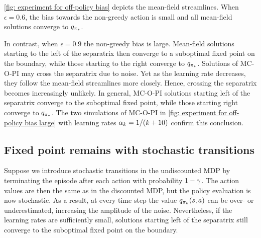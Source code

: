 \autoref{fig: experiment for off-policy bias} depicts the mean-field streamlines.
% 
When $\epsilon=0.6$, the bias towards the non-greedy action is small and all mean-field solutions converge to $q_{{\pi}_*}$. 

In contrast, when $\epsilon=0.9$ the non-greedy bias is large. Mean-field solutions starting to the left of the separatrix then converge to a suboptimal fixed point on the boundary, while those starting to the right converge to $q_{{\pi}_*}$.
Solutions of MC-O-PI may cross the separatrix due to noise.
Yet as the learning rate decreases, they follow the mean-field streamlines more closely. Hence, crossing the separatrix becomes increasingly unlikely.
In general, MC-O-PI solutions starting left of the separatrix converge to the suboptimal fixed point,
while those starting right converge to $q_{{\pi}_*}$.
The two simulations of MC-O-PI in \autoref{fig: experiment for off-policy bias large} with learning rates $\alpha_k = 1/(k+10)$ confirm this conclusion.



\subsection{Fixed point remains with stochastic transitions}

\vspace{-0.2cm}

Suppose we introduce stochastic transitions in the undiscounted MDP by terminating the episode after each action with probability $1-\gamma$.
The action values are then the same as in the discounted MDP, but the policy evaluation is now stochastic.
As a result, at every time step the value $q_{\pi_k}(s,a)$ can be over- or underestimated, increasing the amplitude of the noise.
Nevertheless, if the learning rates are sufficiently small, solutions starting left of the separatrix still converge to the suboptimal fixed point on the boundary.

